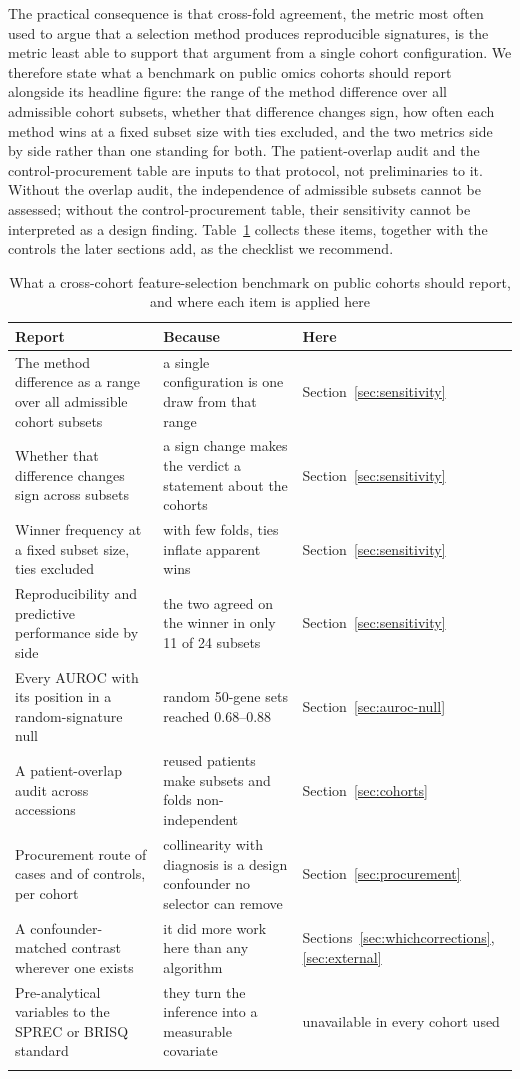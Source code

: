 \documentclass[pdflatex,sn-vancouver-num]{sn-jnl}
\theoremstyle{thmstyleone}
\theoremstyle{thmstyletwo}
\theoremstyle{thmstylethree}
\begin{document}
The practical consequence is that cross-fold agreement, the metric most often used to argue that
a selection method produces reproducible signatures, is the metric least able to support that
argument from a single cohort configuration. We therefore state what a benchmark on public
omics cohorts should report alongside its headline figure: the range of the method difference
over all admissible cohort subsets, whether that difference changes sign, how often each method
wins at a fixed subset size with ties excluded, and the two metrics side by side rather than
one standing for both. The patient-overlap audit and the control-procurement table are inputs to
that protocol, not preliminaries to it. Without the overlap audit, the independence of
admissible subsets cannot be assessed; without the control-procurement table, their
sensitivity cannot be interpreted as a design finding. Table~\ref{tab:checklist} collects these items, together with the controls the later sections add, as the checklist we recommend.

\begin{table}[h]
\caption{What a cross-cohort feature-selection benchmark on public cohorts should report, and where each item is applied here}\label{tab:checklist}
\footnotesize
\setlength{\tabcolsep}{4pt}
\begin{tabular}{@{}p{46mm}p{46mm}p{28mm}@{}}
\toprule
Report & Because & Here \\
\midrule
The method difference as a range over all admissible cohort subsets & a single configuration is one draw from that range & Section~\ref{sec:sensitivity} \\
Whether that difference changes sign across subsets & a sign change makes the verdict a statement about the cohorts & Section~\ref{sec:sensitivity} \\
Winner frequency at a fixed subset size, ties excluded & with few folds, ties inflate apparent wins & Section~\ref{sec:sensitivity} \\
Reproducibility and predictive performance side by side & the two agreed on the winner in only 11 of 24 subsets & Section~\ref{sec:sensitivity} \\
Every AUROC with its position in a random-signature null & random 50-gene sets reached 0.68--0.88 & Section~\ref{sec:auroc-null} \\
A patient-overlap audit across accessions & reused patients make subsets and folds non-independent & Section~\ref{sec:cohorts} \\
Procurement route of cases and of controls, per cohort & collinearity with diagnosis is a design confounder no selector can remove & Section~\ref{sec:procurement} \\
A confounder-matched contrast wherever one exists & it did more work here than any algorithm & Sections~\ref{sec:whichcorrections}, \ref{sec:external} \\
Pre-analytical variables to the SPREC or BRISQ standard & they turn the inference into a measurable covariate & unavailable in every cohort used \\
\botrule
\end{tabular}
\end{table}
\end{document}
